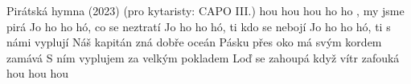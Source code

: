 \begin{TEXT}{Pirátská hymna  (2023)}
\SLOKA* (pro kytaristy: CAPO III.)\NL
\SLOKA* {} hou hou hou
\REFREN {} ho ho  , my jsme pirá \NL
Jo ho ho hó, co se neztratí\NL
Jo ho ho hó, ti kdo se nebojí\NL
Jo ho ho hó, ti s námi vyplují
\SLOKA* Náš kapitán\NL
zná dobře oceán\NL
Pásku přes oko má\NL
svým kordem zamává\NL
\SLOKA*S ním vyplujem\NL
za velkým pokladem\NL
Loď se zahoupá\NL
když vítr zafouká
\SLOKA* {} hou hou hou
\REFRENHRAJ
\end{TEXT}

